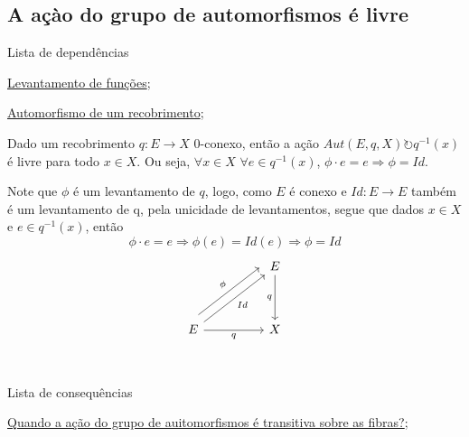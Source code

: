 \subsection{A açào do grupo de automorfismos é livre}
\label{acao-de-automorfismos-e-livre-prop}
\begin{titlemize}{Lista de dependências}
	\item \hyperref[levantamento-de-funções-prop]{Levantamento de funções};\\
	\item \hyperref[automorfismo-de-recobrimento-def]{Automorfismo de um recobrimento};
\end{titlemize}
\begin{prop}
	Dado um recobrimento $q:E \longrightarrow X$ $0$-conexo, então a ação $Aut(E, q, X) \circlearrowright q^{-1}(x)$ é livre para todo $x \in X$. Ou seja, $\forall x \in X$ $\forall e \in q^{-1}(x)$, $\phi \cdot e = e \Longrightarrow \phi = Id$.\\
\end{prop}

\begin{dem}
    Note que $\phi$ é um levantamento de $q$, logo, como $E$ é conexo e $Id:E \longrightarrow E$ também é um levantamento de q, pela unicidade de levantamentos, segue que dados $x \in X$ e $e \in q^{-1}(x)$, então $$\phi \cdot e = e \Longrightarrow \phi(e) = Id(e) \Longrightarrow \phi = Id$$
    \[\begin{tikzcd}
    	&& E \\
    	\\
    	E && X \\
    	\arrow["q"', from=1-3, to=3-3]
    	\arrow["Id"', from=3-1, to=1-3]
    	\arrow["\phi", shift left=3, from=3-1, to=1-3]
    	\arrow["q"', from=3-1, to=3-3]
    \end{tikzcd}\]
\end{dem}

\begin{titlemize}{Lista de consequências}
	\item \hyperref[acao-de-automorfismo-transitiva-prop]{Quando a ação do grupo de auitomorfismos é transitiva sobre as fibras?};
\end{titlemize}